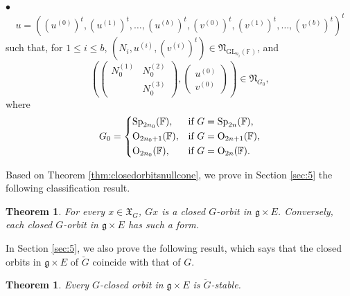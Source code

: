 \documentclass[12pt]{amsart}
\newtheorem{theorem}[lm]{Theorem}
\theoremstyle{definition}
\theoremstyle{remark}\newtheorem{rmk}[lm]{Remark}
\newcommand{\RO}{{\mathrm {O}}}
\newcommand{\GL}{{\mathrm{GL}}}
\newcommand{\Sp}{{\mathrm{Sp}}}
\newcommand{\g}{\mathfrak g}
\newcommand{\fN}{\mathfrak N}
\newcommand{\fX}{\mathfrak X}
\newcommand{\C}{\mathbb{F}}
\begin{document}
        $\bullet$
        \begin{equation}
        \label{eq:closedsov}
            u=\left(\left(u^{(0)}\right)^t,\left(u^{(1)}\right)^t,\dots,\left(u^{(b)}\right)^t,\left(v^{(0)}\right)^t,\left(v^{(1)}\right)^t,\dots,\left(v^{(b)}\right)^t\right)^t
        \end{equation}
        such that, for $1\leq i\leq b$, $(N_i,u^{(i)},\left(v^{(i)}\right)^t)\in\fN_{\GL_{n_i}(\C)}$, and
        \begin{equation*}
            \left(\left(\begin{matrix}
				N_0^{(1)}&N_0^{(2)}\\&N_0^{(3)}
			\end{matrix}\right),\left(\begin{matrix}
			    u^{(0)}\\v^{(0)}
			\end{matrix}\right)\right)\in\fN_{G_0},
        \end{equation*}
        where
        \begin{equation}
        	\label{eq:subgroup}
            G_0=\begin{cases*}
                \Sp_{2n_0}(\C),&if $G=\Sp_{2n}(\C)$,\\
                \RO_{2n_0+1}(\C),&if $G=\RO_{2n+1}(\C)$,\\
                \RO_{2n_0}(\C),&if $G=\RO_{2n}(\C)$.
            \end{cases*}
        \end{equation}


        Based on Theorem \ref{thm:closedorbitsnullcone}, we prove in Section \ref{sec:5} the following classification result. 
        
	\begin{theorem}
		\label{thm:closedorbit}
		For every $x\in\fX_G$, $Gx$ is a closed $G$-orbit in $\g\times E$. Conversely, each closed $G$-orbit in $\g\times E$ has such a form.
	\end{theorem}
    
In Section \ref{sec:5}, we also prove     
the following result, which says that the closed orbits in $\g\times E$ of  $\breve{G}$ coincide with that of $G$. 

    \begin{theorem}
		\label{thm:closedorbitsmvw}
        Every $G$-closed orbit in $\g\times E$ is $\breve{G}$-stable.
	\end{theorem}
\end{document}
